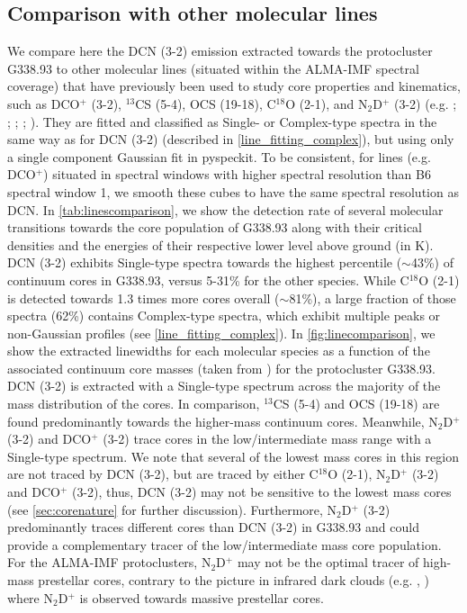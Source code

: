\documentclass[longauth]{aa} %
\begin{document}
\subsection{Comparison with other molecular lines}
\label{sec:line_comp}
We compare here the DCN (3-2) emission extracted towards the protocluster G338.93 to other molecular lines (situated within the ALMA-IMF spectral coverage) that have previously been used to study core properties and kinematics, such as DCO$^+$ (3-2), $^{13}$CS (5-4), OCS (19-18), C$^{18}$O (2-1), and N$_2$D$^+$ (3-2) (e.g. \citealt{Li2022}; \citealt{Sakai2022}; \citealt{Nony2020}; \citealt{Cunningham2016}; \citealt{Maud2015}). They are fitted and classified as Single- or Complex-type spectra in the same way as for DCN (3-2) (described in \cref{line_fitting_complex}), but using only a single component Gaussian fit in pyspeckit. To be consistent, for lines (e.g. DCO$^+$) situated in spectral windows with higher spectral resolution than B6 spectral window 1, we smooth these cubes to have the same spectral resolution as DCN. In \cref{tab:linescomparison}, we show the detection rate of several molecular transitions towards the core population of G338.93 along with their critical densities and the energies of their respective lower level above ground (in K).
DCN (3-2) exhibits Single-type spectra towards the highest percentile ($\sim$43\%) of continuum cores in G338.93, versus 5-31\% for the other species. While C$^{18}$O (2-1) is detected towards 1.3 times more cores overall ($\sim$81\%), a large fraction of those spectra (62\%) contains Complex-type spectra, which exhibit multiple peaks or non-Gaussian profiles (see \cref{line_fitting_complex}).
In \cref{fig:linecomparison}, we show the extracted linewidths for each molecular species as a function of the associated continuum core masses (taken from \citealt{louvet22}) for the protocluster G338.93. DCN (3-2) is extracted with a Single-type spectrum across the majority of the mass distribution of the cores. In comparison, $^{13}$CS (5-4) and OCS (19-18) are found predominantly towards the higher-mass continuum cores. Meanwhile, N$_2$D$^+$ (3-2) and DCO$^+$ (3-2) trace cores in the low/intermediate mass range with a Single-type spectrum. We note that several of the lowest mass cores in this region are not traced by DCN (3-2), but are traced by either C$^{18}$O (2-1), N$_2$D$^+$ (3-2) and DCO$^+$ (3-2), thus, DCN (3-2) may not be sensitive to the lowest mass cores (see \cref{sec:corenature} for further discussion). Furthermore, N$_2$D$^+$ (3-2) predominantly traces different cores than DCN (3-2) in G338.93 and could provide a complementary tracer of the low/intermediate mass core population. For the ALMA-IMF protoclusters, N$_2$D$^+$ may not be the optimal tracer of high-mass prestellar cores, contrary to the picture in infrared dark clouds (e.g. \citealt{Tan2013}, \citealt{Barnes23}) where N$_2$D$^+$ is observed towards massive prestellar cores. 
\end{document}
